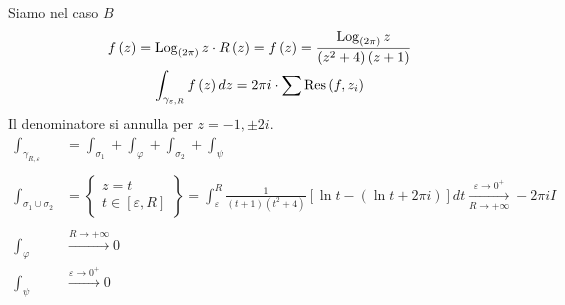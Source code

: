 Siamo nel caso $B$
\begin{gather*}
f\left(z\right) = \operatorname{Log}_{\left(2\pi \right)} z \cdot R\left(z\right) = f\left(z\right) = \frac{\operatorname{Log}_{\left(2\pi \right)} z}{\left(z^{2} + 4\right)\left(z + 1\right)}\\
\int_{\gamma_{\varepsilon, R}} f\left(z\right) dz = 2\pi i \cdot \sum \operatorname{Res} \left(f, z_{i}\right)
\end{gather*}
Il denominatore si annulla per $z = -1, \pm 2i$.
\begin{equation*}
\begin{aligned}
\int_{\gamma_{R, \varepsilon}} & = \int_{\sigma_{1}} + \int_{\varphi} + \int_{\sigma_{2}} + \int_{\psi}\\
 & \\
\int_{\sigma_{1} \cup \sigma_{2}} & = \left\{
\begin{array}{c}
z = t\\
t\in \left[ \varepsilon, R\right]
\end{array}\right\} = \int^{R}_{\varepsilon}\frac{1}{\left(t + 1\right)\left(t^{2} + 4\right)}\left[\ln t - \left(\ln t + 2\pi i\right)\right] dt\xrightarrow[R\rightarrow + \infty ]{\varepsilon \rightarrow 0^{+}} - 2\pi iI\\
 & \\
\int_{\varphi} & \xrightarrow{R\rightarrow + \infty} 0\\
\int_{\psi} & \xrightarrow{\varepsilon \rightarrow 0^{+}} 0
\end{aligned}
\end{equation*}
\Soluzione

